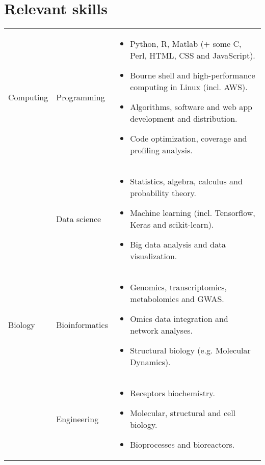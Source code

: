 \documentclass{CV}
\begin{document}
\section*{Relevant skills}
\begin{tabular}{p{} p{} p{}}
Computing & 
	Programming &
		\begin{itemize}\setlength\itemsep{-0.5em}
		\vspace{-1.8em}
		\item Python, R, Matlab (+ some C, Perl, HTML, CSS and JavaScript).
		\item Bourne shell and high-performance computing in Linux (incl. AWS).
		\item Algorithms, software and web app development and distribution.
		\item Code optimization, coverage and profiling analysis.
		\end{itemize}\\
& 
	Data science &
		\begin{itemize}\setlength\itemsep{-0.5em}
		\vspace{-1.8em}
		\item Statistics, algebra, calculus and probability theory.
		\item Machine learning (incl. Tensorflow, Keras and scikit-learn).
		\item Big data analysis and data visualization.
		\end{itemize}\\
		
Biology & 
	Bioinformatics &
		\begin{itemize}\setlength\itemsep{-0.5em}
		\vspace{-1.8em}
		\item Genomics, transcriptomics, metabolomics and GWAS.
		\item Omics data integration and network analyses.
		\item Structural biology (e.g. Molecular Dynamics).
		\end{itemize}\\
& 
	Engineering &
		\begin{itemize}\setlength\itemsep{-0.5em}
		\vspace{-1.8em}
		\item Receptors biochemistry.
		\item Molecular, structural and cell biology.
		\item Bioprocesses and bioreactors.
		\end{itemize}\\
		

\end{tabular}
\end{document}
